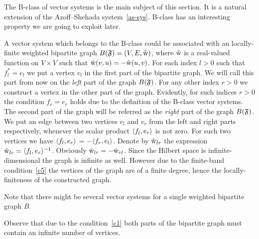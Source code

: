 \documentclass[12pt]{amsart}
\begin{document}
    The B-class of vector systems is the main subject of this section.
    It is a natural extension of the Azoff--Shehada system~\eqref{as-sys}.
    B-class has an interesting property we are going to exploit later.
    \begin{remark}
      A vector system which belongs to the B-class could be associated with an
        locally-finite weighted bipartite graph $B(\mathfrak{F}) = (V, E, \mathrm{\hat{w}})$, where $\mathrm{\hat{w}}$ is a
        real-valued function on $V\times V$ such that $\mathrm{\hat{w}}(v, u) = -\mathrm{\hat{w}}(u, v)$.
      For each index $l > 0$ such that $f^*_l = e_l$ we put a vertex $v_l$ in the first part of the bipartite graph.
      We will call this part from now on the \emph{left} part of the graph $B(\mathfrak{F})$.
      For any other index $r > 0$ we construct a vertex in the other part of the graph.
      Evidently, for such indices $r > 0$ the condition $f_r = e_r$ holds due to the definition of the B-class vector systems.
      The second part of the graph will be referred as the \emph{right} part of the graph $B(\mathfrak{F})$.
      We put an edge between two vertices $v_l$ and $v_r$ from the left and right parts respectively,
        whenever the scalar product $\langle f_l, e_r \rangle$ is not zero.
      For such two vertices we have $\langle f_l, e_r \rangle$ = $-\langle f_r, e_l \rangle$.
      Denote by $\mathrm{\hat{w}}_{lr}$ the expression $\mathrm{\hat{w}}_{lr} = \langle f_l, e_r \rangle^{-1}$.
      Obviously $\mathrm{\hat{w}}_{lr} = -\mathrm{\hat{w}}_{rl}$.
      Since the Hilbert space is infinite-dimensional the graph is infinite as well.
      However due to the finite-band condition~\ref{c5} the vertices of the graph are of a finite degree, hence the locally-finiteness of
        the constructed graph.
    \end{remark}
    \begin{remark}
      Note that there might be several vector systems for a single weighted bipartite graph $B$.
    \end{remark}
    \begin{remark}
      Observe that due to the condition~\ref{c1} both parts of the bipartite graph must
        contain an infinite number of vertices.
    \end{remark}
\end{document}
